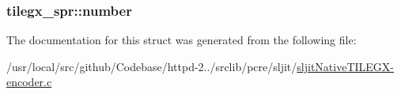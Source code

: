 \subsubsection[{\texorpdfstring{number}{number}}]{ tilegx\+\_\+spr\+::number}\hypertarget{structtilegx__spr_a95b0fd490de5892236070c1cb16221e9}{}\label{structtilegx__spr_a95b0fd490de5892236070c1cb16221e9}


The documentation for this struct was generated from the following file\+:\begin{DoxyCompactItemize}
\item 
/usr/local/src/github/\+Codebase/httpd-\/2../srclib/pcre/sljit/\hyperlink{sljitNativeTILEGX-encoder_8c}{sljit\+Native\+T\+I\+L\+E\+G\+X-\/encoder.\+c}\end{DoxyCompactItemize}
